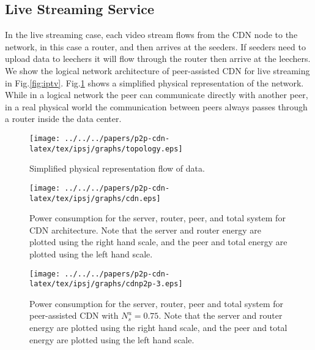 \subsection{Live Streaming Service}
In the live streaming case, each video stream flows from the CDN node to the network, in this case a router, and then arrives at the seeders. 
If seeders need to upload data to leechers it will flow through the router then arrive at the leechers. 
We show the logical network architecture of peer-assisted CDN for live streaming in Fig.\ref{fig:iptv}. 
Fig.\ref{fig:dummy} shows a simplified physical representation of the network. While in a logical network the peer can communicate directly with another peer, in a real physical world the communication between peers always passes through a router inside the data center.


\begin{figure}[tb]
\begin{center}
\texttt{[image: ../../../papers/p2p-cdn-latex/tex/ipsj/graphs/topology.eps]}
\end{center}
\caption{Simplified physical representation flow of data.}
\label{fig:dummy}
\vspace{-2mm}
\end{figure} 

\begin{figure}[tb]
\begin{center}
\texttt{[image: ../../../papers/p2p-cdn-latex/tex/ipsj/graphs/cdn.eps]}
\end{center}
\caption{Power consumption for the server, router, peer, and total system for CDN architecture. Note that the server and router energy are plotted using the right hand scale, and the peer and total energy are plotted using the left hand scale.}
\label{fig:purecdn}
\vspace{-2mm}
\end{figure} 

\begin{figure}[tb]
\begin{center}
\texttt{[image: ../../../papers/p2p-cdn-latex/tex/ipsj/graphs/cdnp2p-3.eps]}
\end{center}
\caption{Power consumption for the server, router, peer and total system for peer-assisted CDN with $N_s^u=0.75$. Note that the server and router energy are plotted using the right hand scale, and the peer and total energy are plotted using the left hand scale.}
\label{fig:cdnp2p}
\vspace{-2mm}
\end{figure} 


